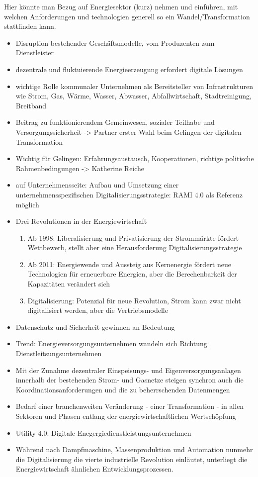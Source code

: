 Hier könnte man Bezug auf Energiesektor (kurz) nehmen und einführen, mit welchen Anforderungen und technologien generell so ein Wandel/Transformation stattfinden kann.
\begin{itemize}
  \item Disruption bestehender Geschäftsmodelle, vom Produzenten zum Dienstleister \citep{Doleski2017}
  \item dezentrale und fluktuierende Energieerzeugung erfordert digitale Lösungen
  \item wichtige Rolle kommunaler Unternehmen als Bereitsteller von Infrastrukturen wie Strom, Gas, Wärme, Wasser, Abwasser, Abfallwirtschaft, Stadtreinigung, Breitband \citep{Doleski2017}
  \item Beitrag zu funktionierendem Gemeinwesen, sozialer Teilhabe und Versorgungssicherheit -> Partner erster Wahl beim Gelingen der digitalen Transformation
  \item Wichtig für Gelingen: Erfahrungsaustausch, Kooperationen, richtige politische Rahmenbedingungen -> Katherine Reiche
  \item auf Unternehmensseite: Aufbau und Umsetzung einer unternehmensspezifischen Digitalisierungsstrategie: RAMI 4.0 als Referenz möglich
  \item Drei Revolutionen in der Energiewirtschaft \citep{Doleski2017}
  \begin{enumerate}
    \item Ab 1998: Liberalisierung und Privatisierung der Strommärkte fördert Wettbewerb, stellt aber eine Herausforderung Digitalisierungsstrategie
    \item Ab 2011: Energiewende und Aussteig aus Kernenergie fördert neue Technologien für erneuerbare Energien, aber die Berechenbarkeit der Kapazitäten verändert sich
    \item Digitalisierung: Potenzial für neue Revolution, Strom kann zwar nicht digitalisiert werden, aber die Vertriebsmodelle
  \end{enumerate}
  \item Datenschutz und Sicherheit gewinnen an Bedeutung
  \item Trend: Energieversorgungsunternehmen wandeln sich Richtung Dienstleitsungsunternehmen
  \item \glqq Mit der Zunahme dezentraler Einspeisungs- und Eigenversorgungsanlagen innerhalb der bestehenden Strom- und Gasnetze steigen synchron auch die Koordinationsanforderungen und die zu beherrschenden Datenmengen \grqq{} \citep[S. 7]{Doleski2016}
  \item \glqq Bedarf einer branchenweiten Veränderung - einer Transformation - in allen Sektoren und Phasen entlang der energiewirtschaftlichen Wertschöpfung\grqq{} \cite[S. 11]{Doleski2016}
  \item Utility 4.0: Digitale Enegergiedienstleistungsunternehmen
  \item Während nach Dampfmaschine, Massenproduktion und Automation nunmehr die Digitalisierung die vierte industrielle Revolution einläutet, unterliegt die Energiewirtschaft ähnlichen Entwicklungsprozessen.
\end{itemize}

